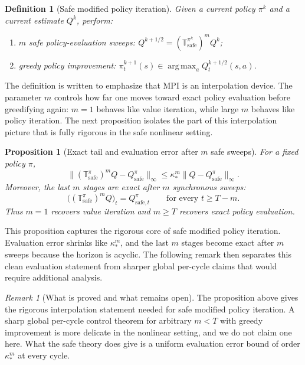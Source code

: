 \documentclass{article}
\newtheorem{proposition}[proposition]{Proposition}
\newtheorem{definition}[definition]{Definition}
\theoremstyle{remark}
\newtheorem{remark}[remark]{Remark}
\DeclareMathOperator*{\argmax}{arg\,max}
\newcommand{\safe}{\mathrm{safe}}
\begin{document}
\begin{definition}[Safe modified policy iteration]
\label{def:lse-mpi}
Given a current policy $\pi^k$ and a current estimate $Q^k$, perform:
\begin{enumerate}[leftmargin=1.5em,itemsep=2pt]
    \item $m$ safe policy-evaluation sweeps: $Q^{k+1/2}=(\mathbb T_\safe^{\pi^k})^mQ^k$;
    \item greedy policy improvement: $\pi^{k+1}_t(s)\in\argmax_a Q^{k+1/2}_t(s,a)$.
\end{enumerate}
\end{definition}

The definition is written to emphasize that MPI is an interpolation device.
The parameter $m$ controls how far one moves toward exact policy evaluation before greedifying again: $m=1$ behaves like value iteration, while large $m$ behaves like policy iteration.
The next proposition isolates the part of this interpolation picture that is fully rigorous in the safe nonlinear setting.

\begin{proposition}[Exact tail and evaluation error after $m$ safe sweeps]
\label{prop:mpi-tail-exact}
For a fixed policy $\pi$,
\begin{equation}
\|(\mathbb T_\safe^{\pi})^mQ - Q_\safe^{\pi}\|_\infty
\le
\kappa_*^m\|Q-Q_\safe^{\pi}\|_\infty.
\label{eq:mpi-tail-rate}
\end{equation}
Moreover, the last $m$ stages are exact after $m$ synchronous sweeps:
\[
\bigl((\mathbb T_\safe^{\pi})^mQ\bigr)_t = Q_{\safe,t}^{\pi}
\qquad\text{for every } t\ge T-m.
\]
Thus $m=1$ recovers value iteration and $m\ge T$ recovers exact policy evaluation.
\end{proposition}

This proposition captures the rigorous core of safe modified policy iteration.
Evaluation error shrinks like $\kappa_*^m$, and the last $m$ stages become exact after $m$ sweeps because the horizon is acyclic.
The following remark then separates this clean evaluation statement from sharper global per-cycle claims that would require additional analysis.


\begin{remark}[What is proved and what remains open]
\label{rem:mpi-open}
The proposition above gives the rigorous interpolation statement needed for safe modified policy iteration.
A sharp global per-cycle control theorem for arbitrary $m<T$ with greedy improvement is more delicate in the nonlinear setting, and we do not claim one here.
What the safe theory does give is a uniform evaluation error bound of order $\kappa_*^m$ at every cycle.
\end{remark}
\end{document}
